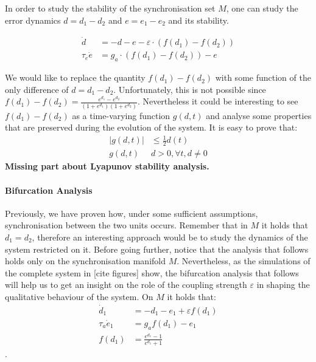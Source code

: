 In order to study the stability of the synchronisation set $M$, one can study the error dynamics $d=d_1 - d_2$ and $e= e_1 - e_2$ and its stability. 

\begin{equation} 
\begin{aligned}
\dot d &= -d - e - \varepsilon \cdot (f(d_1) - f(d_2)) \\
\tau_e \dot e &= g_a \cdot (f(d_1) - f(d_2)) - e
\end{aligned}
\end{equation}


 We would like to replace the quantity $f(d_1) - f(d_2)$ with some function of the only difference of $d=d_1-d_2$. Unfortunately, this is not possible since $f(d_1)-f(d_2) = \frac{e^{d_1}-e^{d_2}}{(1+e^{d_1})(1+e^{d_2})}$. Nevertheless it could be interesting to see $f(d_1)-f(d_2)$ as a time-varying function $g(d, t)$ and analyse some properties that are preserved during the evolution of the system.
It is easy to prove that:
\begin{equation}
\begin{aligned}
|g(d,t)| &\leq \frac{1}{2}d(t) \\
g(d,t)&d>0, \forall t, d\neq0
\end{aligned}
\end{equation}
\textbf{Missing part about Lyapunov stability analysis.}

\paragraph{Bifurcation Analysis}
Previously, we have proven how, under some sufficient assumptions, synchronisation between the two units occurs. Remember that in $M$ it holds that $d_1=d_2$, therefore an interesting approach would be to study the dynamics of the system restricted on it. Before going further, notice that the analysis that follows holds only on the synchronisation manifold $M$. Nevertheless, as the simulations of the complete system in [cite figures] show, the bifurcation analysis that follows will help us to get an insight on the role of the coupling strength $\varepsilon$ in shaping the qualitative behaviour of the system. On $M$ it holds that:
\begin{equation}
\begin{aligned}
\dot d_{1} &= - d_1 - e_1 + \varepsilon f(d_1) \\
\tau_a \dot{e}_{1}&=g_a f(d_1) - e_{1}\\
f(d_1) &= \frac{e^{d_1}-1}{e^{d_1}+1}
\end{aligned}
\label{eq:2D_sync}
\end{equation}.

